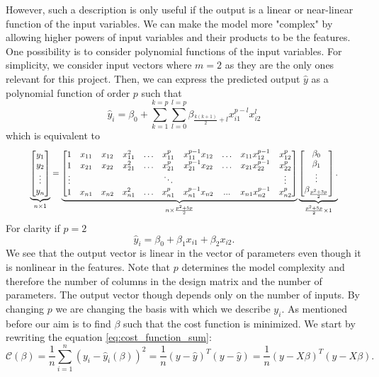 However, such a description is only useful if the output is a linear or near-linear function of the input variables.  We can make the model more "complex" by allowing higher powers of input variables and their products to be the features. One possibility is to consider polynomial functions of the input variables. For simplicity, we consider input vectors where $m=2$ as they are the only ones relevant for this project. Then, we can express the predicted output $\hat{y}$ as a polynomial function of order $p$ such that
\begin{equation}
    \hat{y}_i = \beta_0 + \sum_{k=1}^{k=p}\sum_{l=0}^{l=p}\beta_{\frac{k(k+1)}{2}+l}x_{i1}^{p-l}x_{i2}^{l}
\end{equation}
which is equivalent to
\begin{equation}
\resizebox{.9\hsize}{!}{$
    \underbrace{\begin{bmatrix}y_1 \\ y_2 \\ \vdots \\ y_n\end{bmatrix}}_{n \times 1} = \underbrace{\begin{bmatrix} 
    1 & x_{11} & x_{12} & x_{11}^2 & \dots & x_{11}^p & x_{11}^{p-1}x_{12} & \dots & x_{11}x_{12}^{p-1} & x_{12}^p 
    \\ 1 & x_{21} & x_{22} & x_{21}^2 & \dots & x_{21}^p & x_{21}^{p-1}x_{22} & \dots & x_{21}x_{22}^{p-1} & x_{22}^p 
    \\ \vdots &&&&& \ddots &&&&\vdots \\ 
    1 & x_{n1} & x_{n2} & x_{n1}^2 & \dots & x_{n1}^p & x_{n1}^{p-1}x_{n2} & ... & x_{n1}x_{n2}^{p-1} & x_{n2}^p
    \end{bmatrix}}_{n \times \frac{p^2+5p}{2}}\underbrace{\begin{bmatrix}\beta_0 \\ \beta_1 \\ \vdots \\ \beta_{\frac{p^2+3p}{2}}\end{bmatrix}.}_{\frac{p^2+5p}{2} \times 1}$}
\end{equation}
For clarity if $p=2$
\begin{equation*}
    \hat{y}_i = \beta_0+\beta_1 x_{i1} + \beta_2 x_{i2}.
\end{equation*}
We see that the output vector is linear in the vector of parameters even though it is nonlinear in the features. Note that $p$ determines the model complexity and therefore the number of columns in the design matrix and the number of parameters. The output vector though depends only on the number of inputs. By changing $p$ we are changing the basis with which we describe $y_i$. 
\newline \newline
As mentioned before our aim is to find $\beta$ such that the cost function is minimized. We start by rewriting the equation \ref{eq:cost_function_sum}:
\begin{equation}
    \mathcal{C}(\beta) = \frac{1}{n}\sum_{i=1}^{n}(y_i-\hat{y}_i(\beta))^2 = \frac{1}{n}( y -  {\hat y})^T( y -  {\hat y}) = \frac{1}{n}( y -  {X\beta})^T( y -  {X\beta}).
\end{equation}

